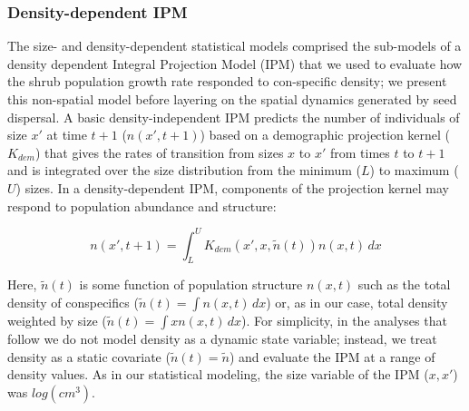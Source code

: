 \documentclass[11pt]{article}\usepackage[]{graphicx}\usepackage[usenames,dvipsnames]{xcolor}
\begin{document}
\subsubsection*{Density-dependent IPM}
The size- and density-dependent statistical models comprised the sub-models of a density dependent Integral Projection Model (IPM) that we used to evaluate how the shrub population growth rate responded to con-specific density; we present this non-spatial model before layering on the spatial dynamics generated by seed dispersal. 
A basic density-independent IPM predicts the number of individuals of size $x\prime$ at time $t+1$ ($n(x\prime,t + 1)$) based on a demographic projection kernel ($K_{dem}$) that gives the rates of transition from sizes $x$ to $x\prime$ from times $t$ to $t+1$ and is integrated over the size distribution from the minimum ($L$) to maximum ($U$) sizes. In a density-dependent IPM, components of the projection kernel may respond to population abundance and structure:
\begin{linenomath*} 
\begin{equation} \label{eq:DDIPM}
n(x\prime,t + 1) = \int_{L}^{U} K_{dem}(x\prime,x,\tilde{n}(t)) n(x,t) \,dx 
\end{equation} 
\end{linenomath*}
Here, $\tilde{n}(t)$ is some function of population structure $n(x,t)$ such as the total density of conspecifics ($\tilde{n}(t)=\int n(x,t) \,dx$) or, as in our case, total density weighted by size ($\tilde{n}(t)=\int x n(x,t) \,dx$). 
For simplicity, in the analyses that follow we do not model density as a dynamic state variable; instead, we treat density as a static covariate ($\tilde{n}(t)=\tilde{n}$) and evaluate the IPM at a range of density values. 
As in our statistical modeling, the size variable of the IPM ($x,x\prime$) was $log(cm^3)$.
\end{document}
